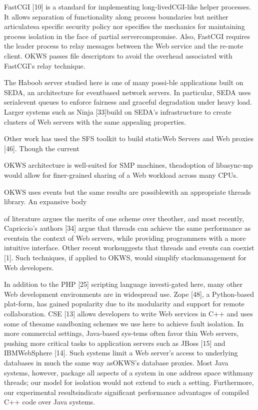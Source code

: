 FastCGI [10] is a standard for implementing long-livedCGI-like helper processes. It allows separation of functionality along process boundaries but neither articulatesa specific security policy nor specifies the mechanics for
maintaining process isolation in the face of partial servercompromise. Also, FastCGI requires the leader process
to relay messages between the Web service and the re-mote client. OKWS passes file descriptors to avoid the
overhead associated with FastCGI's relay technique.

The Haboob server studied here is one of many possi-ble applications built on SEDA, an architecture for eventbased network servers. In particular, SEDA uses serialevent queues to enforce fairness and graceful degradation under heavy load. Larger systems such as Ninja [33]build on SEDA's infrastructure to create clusters of Web
servers with the same appealing properties.

Other work has used the SFS toolkit to build staticWeb Servers and Web proxies [46]. Though the current

OKWS architecture is well-suited for SMP machines, theadoption of libasync-mp would allow for finer-grained
sharing of a Web workload across many CPUs.

OKWS uses events but the same results are possiblewith an appropriate threads library. An expansive body

of literature argues the merits of one scheme over theother, and most recently, Capriccio's authors [34] argue
that threads can achieve the same performance as eventsin the context of Web servers, while providing programmers with a more intuitive interface. Other recent worksuggests that threads and events can coexist [1]. Such
techniques, if applied to OKWS, would simplify stackmanagement for Web developers.

In addition to the PHP [25] scripting language investi-gated here, many other Web development environments
are in widespread use. Zope [48], a Python-based plat-form, has gained popularity due to its modularity and
support for remote collaboration. CSE [13] allows developers to write Web services in C++ and uses some of thesame sandboxing schemes we use here to achieve fault
isolation. In more commercial settings, Java-based sys-tems often favor thin Web servers, pushing more critical
tasks to application servers such as JBoss [15] and IBMWebSphere [14]. Such systems limit a Web server's access to underlying databases in much the same way asOKWS's database proxies. Most Java systems, however,
package all aspects of a system in one address space withmany threads; our model for isolation would not extend
to such a setting. Furthermore, our experimental resultsindicate significant performance advantages of compiled
C++ code over Java systems.

